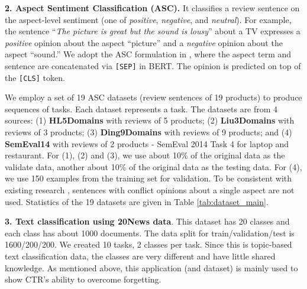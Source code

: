 \documentclass{article}
\begin{document}
\textbf{2. Aspect Sentiment Classification (ASC).} It classifies a review sentence on the aspect-level sentiment (one of \textit{positive}, \textit{negative}, and \textit{neutral}).
For example, the sentence ``\textit{The picture is great but the sound is lousy}'' about a TV expresses a \textit{positive} opinion about the aspect ``picture'' and a \textit{negative} opinion about the aspect ``sound.'' We adopt the ASC formulation in \cite{DBLP:conf/naacl/XuLSY19}, where the aspect term and sentence are concatenated via \texttt{[SEP]} in BERT. The opinion is predicted on top of the \texttt{[CLS]} token.

We employ a set of 19 ASC datasets (review sentences of 19 products) to produce sequences of tasks. Each dataset represents a task. The datasets are from 4 sources: (1) \textbf{HL5Domains} \cite{hu2004mining} with reviews of 5 products; (2) \textbf{Liu3Domains} \cite{liu2015automated} with reviews of 3 products; (3) \textbf{Ding9Domains} \cite{ding2008holistic} with reviews of 9 products; and (4) \textbf{SemEval14} with reviews of 2 products - SemEval 2014 Task 4 for laptop and restaurant. For (1), (2) and (3), we use about 10\% of the original data as the validate data, another about 10\% of the original data as the testing data. For (4), we use 150 examples from the training set for validation. To be consistent with existing research \cite{tang-etal-2016-aspect},
sentences with conflict opinions 
about a single aspect are not used.
Statistics of the 19 datasets are given in Table \ref{tab:dataset_main}.


\textbf{3. Text classification using 20News data}. This dataset \cite{Lang95} has 20 classes and each class has about 1000 documents. The data split for train/validation/test is 1600/200/200. We created 10 tasks, 2 classes per task. Since this is topic-based text classification data, the classes are very different and have little shared knowledge. As mentioned above, this application (and dataset) is mainly used to show CTR's ability to overcome forgetting. 
\end{document}
